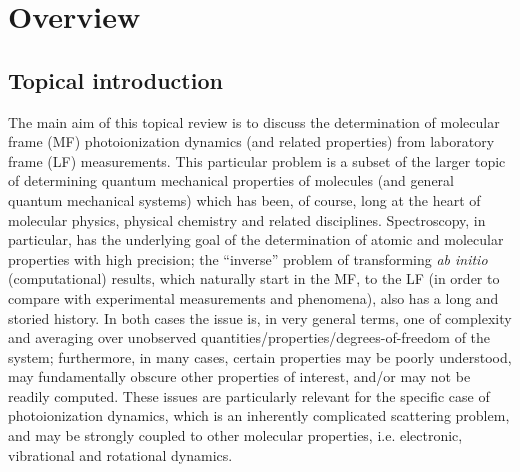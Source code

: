 \documentclass[10pt]{article}
\begin{document}

\section{Overview}

\subsection{Topical introduction}
The main aim of this topical review is to discuss the determination of molecular frame (MF) photoionization dynamics (and related properties) from laboratory frame (LF) measurements. This particular problem is a subset of the larger topic of determining quantum mechanical properties of molecules (and general quantum mechanical systems) which has been, of course, long at the heart of molecular physics, physical chemistry and related disciplines. Spectroscopy, in particular, has the underlying goal of the determination of atomic and molecular properties with high precision; the ``inverse” problem of transforming \textit{ab initio} (computational) results, which naturally start in the MF, to the LF (in order to compare with experimental measurements and phenomena), also has a long and storied history. In both cases the issue is, in very general terms, one of complexity and averaging over unobserved quantities/properties/degrees-of-freedom of the system; furthermore, in many cases, certain properties may be poorly understood, may fundamentally obscure other properties of interest, and/or may not be readily computed. These issues are particularly relevant for the specific case of photoionization dynamics, which is an inherently complicated scattering problem, and may be strongly coupled to other molecular properties, i.e. electronic, vibrational and rotational dynamics. 
\end{document}
